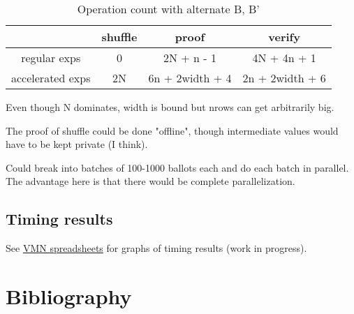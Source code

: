 \documentclass{article}
\begin{document}
\begin{table}[H]
    \centering
    \begin{tabular}{c|c|c|c}
        & shuffle  & proof  & verify \\
\hline
regular exps  & 0  & 2N + n - 1  & 4N + 4n + 1 \\
accelerated exps  & 2N & 6n + 2width + 4  & 2n + 2width + 6 \\
    \end{tabular}
    \caption{Operation count with alternate B, B'}
    \label{tab:my_label}
\end{table}

Even though N dominates, width is bound but nrows can get arbitrarily
big.

The proof of shuffle could be done "offline", though intermediate
values would have to be kept private (I think).

Could break into batches of 100-1000 ballots each and do each batch
in parallel. The advantage here is that there would be complete parallelization.

\subsection{Timing results}

See \href{https://docs.google.com/spreadsheets/d/1Sny1xXxU9vjPnqo2K1QPeBHQwPVWhJOHdlXocMimt88}{VMN spreadsheets} for
graphs of timing results (work in progress).

\section{Bibliography}
\end{document}
